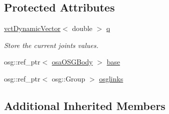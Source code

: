 \subsection*{Protected Attributes}
\begin{DoxyCompactItemize}
\item 
\hyperlink{classvct_dynamic_vector}{vct\-Dynamic\-Vector}$<$ double $>$ \hyperlink{classosa_o_s_g_manipulator_a834ce7263dace4d925133753522abaa3}{q}
\begin{DoxyCompactList}\small\item\em Store the current joints values. \end{DoxyCompactList}\item 
osg\-::ref\-\_\-ptr$<$ \hyperlink{classosa_o_s_g_body}{osa\-O\-S\-G\-Body} $>$ \hyperlink{classosa_o_s_g_manipulator_a6c69fd718f80ec8c73a408f01d2819ef}{base}
\item 
osg\-::ref\-\_\-ptr$<$ osg\-::\-Group $>$ \hyperlink{classosa_o_s_g_manipulator_ad1e42f7391b136a347497f9e6f9df761}{osglinks}
\end{DoxyCompactItemize}
\subsection*{Additional Inherited Members}


